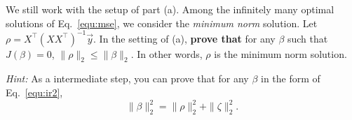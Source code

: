 \item{} We still work with the setup of part (a). Among the infinitely many optimal solutions of Eq.~\eqref{equ:mse}, we consider the \textit{minimum norm} solution. Let $\rho=X^\top (X X^\top)^{-1}\vec{y}$. In the setting of (a), \textbf{prove that} for any $\beta$ such that $J(\beta)=0$, $\|\rho\|_2\le \|\beta\|_2.$ In other words, $\rho$ is the minimum norm solution.

\emph{Hint:} As a intermediate step, you can prove that for any $\beta$ in the form of Eq.~\eqref{equ:ir2}, $$\|\beta\|_2^2=\|\rho\|_2^2+\|\zeta\|_2^2.$$